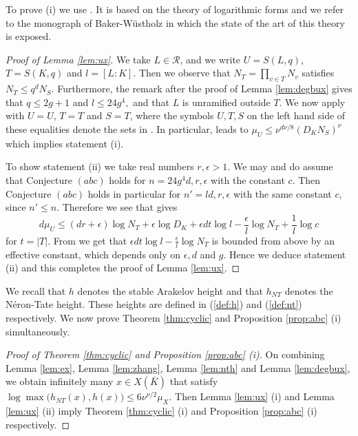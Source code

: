 \documentclass[11pt]{article}
\numberwithin{equation}{section}
\newcommand {\p} {x}
\begin{document}
To prove (i) we use \cite[Proposition 6.1 (ii)]{rvk:szpiro}. It is based on the theory of logarithmic forms and we refer to the monograph of Baker-W\"ustholz \cite{bawu:logarithmicforms} in which the state of the art of this theory is exposed. 

\begin{proof}[Proof of Lemma \ref{lem:ux}]
We take $L\in \mathcal R$, and we write $U=S(L,q)$, $T=S(K,q)$ and $l=[L:K]$. Then we observe that $N_T=\prod_{v\in T}N_v$ satisfies $N_T\leq q^dN_S$. Furthermore, the remark after the proof of Lemma \ref{lem:degbux} gives that $q\leq 2g+1$ and $l\leq 24g^4,$ and that $L$ is unramified outside $T$. 
We now apply \cite[Proposition 6.1]{rvk:szpiro} with  $U=U$, $T=T$ and $S=T$, where the symbols $U,T,S$ on the left hand side of these equalities denote the sets in \cite[Proposition 6.1]{rvk:szpiro}. In particular, \cite[Proposition 6.1 (ii)]{rvk:szpiro} leads to 
$
\mu_U\leq \nu^{d\nu/8}(D_KN_S)^\nu
$ 
which implies statement (i).

To show statement (ii) we take real numbers $r,\epsilon>1$. We may and do assume that Conjecture $(abc)$ holds for $n=24g^4d,r,\epsilon$ with the constant $c$. Then Conjecture $(abc)$ holds in particular for $n'=ld,r,\epsilon$ with the same constant $c$, since $n'\leq n$.  Therefore we see that \cite[Proposition 6.1 (iii)]{rvk:szpiro} gives
$$d\mu_U\leq (dr+\epsilon)\log N_T+\epsilon\log D_K+\epsilon d t\log l-\frac{\epsilon}{l}\log N_T+\frac{1}{l}\log c$$  
for $t=\lvert T\rvert$. From \cite[Lemma 6.3]{rvk:szpiro} we get that  $\epsilon d t\log l-\frac{\epsilon}{l}\log N_T$ is bounded from above by an effective constant, which depends only on  $\epsilon,d$ and $g$. Hence we deduce statement (ii) and this completes the proof of Lemma \ref{lem:ux}.
\end{proof}

We recall that $h$ denotes the stable Arakelov height and that $h_{NT}$ denotes the N\'eron-Tate height. These heights are defined in (\ref{def:h}) and (\ref{def:nt}) respectively. We now prove Theorem \ref{thm:cyclic} and Proposition \ref{prop:abc} (i) simultaneously.

\begin{proof}[Proof of Theorem \ref{thm:cyclic} and Proposition \ref{prop:abc} (i)] 
On combining  Lemma \ref{lem:ex}, Lemma \ref{lem:zhang}, Lemma \ref{lem:nth} and Lemma \ref{lem:degbux}, we obtain
infinitely many $\p\in X(\bar{K})$ that satisfy
$\log \max\bigl(h_{NT}(\p),h(\p)\bigl)\leq 6\nu^{\nu/2}\mu_X.$
Then Lemma \ref{lem:ux} (i) and Lemma \ref{lem:ux} (ii)  imply Theorem \ref{thm:cyclic} (i) and  Proposition \ref{prop:abc} (i) respectively.
\end{proof}
\end{document}
